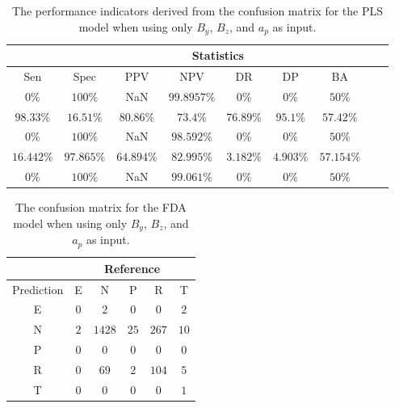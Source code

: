 \begin{table}[!ht]
	\centering
	\begin{tabular}{|c|c|c|c|c|c|c|c|c|}
		\hline
		 & \multicolumn{7}{c|}{Statistics} \\ \hline
		Sen & Spec & PPV & NPV & DR & DP & BA \\ \hline
		$0\%$ & $100\%$ & NaN & $99.8957\%$ & $0\%$ & $0\%$ & $50\%$ \\ \hline
		$98.33\%$ & $16.51\%$ & $80.86\%$ & $73.4\%$ & $76.89\%$ & $95.1\%$ & $57.42\%$ \\ \hline
		$0\%$ & $100\%$ & NaN & $98.592\%$ & $0\%$ & $0\%$ & $50\%$ \\ \hline
		$16.442\%$ & $97.865\%$ & $64.894\%$ & $82.995\%$ & $3.182\%$ & $4.903\%$ & $57.154\%$ \\ \hline
		$0\%$ & $100\%$ & NaN & $99.061\%$ & $0\%$ & $0\%$ & $50\%$ \\ \hline
	\end{tabular}
	\caption{The performance indicators derived from the confusion matrix for the PLS model when using only $B_{y}$, $B_{z}$, and $a_{p}$ as input.}
	\label{tab:cs:yzap:pls}
\end{table}

\begin{table}[!ht]
	\centering
	\begin{tabular}{|c|c|c|c|c|c|}
		\hline
		 & \multicolumn{5}{|c|}{Reference} \\ \hline
		 Prediction & E & N & P & R & T \\ \hline
		 E & $0$ & $2$ & $0$ & $0$ & $2$ \\ \hline
		 N & $2$ & $1428$ & $25$ & $267$ & $10$ \\ \hline
		 P & $0$ & $0$ & $0$ & $0$ & $0$ \\ \hline
		 R & $0$ & $69$ & $2$ & $104$ & $5$ \\ \hline
		 T & $0$ & $0$ & $0$ & $0$ & $1$ \\ \hline
	\end{tabular}
	\caption{The confusion matrix for the FDA model when using only $B_{y}$, $B_{z}$, and $a_{p}$ as input.}
	\label{tab:cm:yzap:fda}
\end{table}

